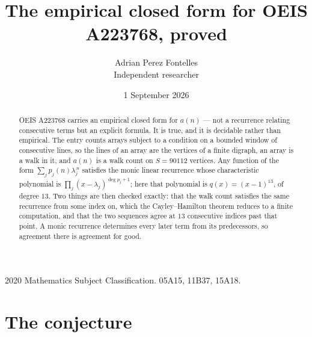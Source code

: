 \documentclass[11pt,a4paper]{article}
\title{The empirical closed form for OEIS A223768, proved}
\author{Adrian Perez Fontelles\\ \small Independent researcher}
\date{1 September 2026}
\theoremstyle{plain}
\theoremstyle{definition}
\begin{document}
\maketitle

\begin{abstract}
OEIS A223768 carries an empirical closed form for $a(n)$ --- not a recurrence relating
consecutive terms but an explicit formula. It is true, and it is decidable rather than
empirical. The entry counts arrays subject to a condition on a bounded window of consecutive lines, so the lines of an array are the
vertices of a finite digraph, an array is a walk in it, and $a(n)$ is a walk count on
$S=90112$ vertices. Any function of the form $\sum_j p_j(n)\lambda_j^{\,n}$ satisfies the
monic linear recurrence whose characteristic polynomial is
$\prod_j(x-\lambda_j)^{\deg p_j+1}$; here that polynomial is $q(x)=(x-1)^{13}$, of degree
$13$. Two things are then checked exactly: that the walk count satisfies the same
recurrence from some index on, which the Cayley--Hamilton theorem reduces to a finite
computation, and that the two sequences agree at $13$ consecutive indices past that
point. A monic recurrence determines every later term from its predecessors, so agreement
there is agreement for good.
\end{abstract}

\noindent\small 2020 Mathematics Subject Classification. 05A15, 11B37, 15A18.\normalsize

\section{The conjecture}
\end{document}
